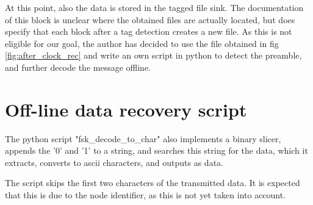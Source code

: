 At this point, also the data is stored in the tagged file sink. The documentation of this block is unclear where the obtained files are actually located, but does specify that each block after a tag detection creates a new file. As this is not eligible for our goal, the author has decided to use the file obtained in fig \ref{fig:after_clock_rec} and write an own script in python to detect the preamble, and further decode the message offline. 

\section{Off-line data recovery script} 
The python script "fsk\_decode\_to\_char" also implements a binary slicer, appends the '0' and '1' to a string, and searches this string for the data, which it extracts, converts to ascii characters, and outputs as data. 

The script skips the first two characters of the transmitted data. It is expected that this is due to the node identifier, as this is not yet taken into account.

